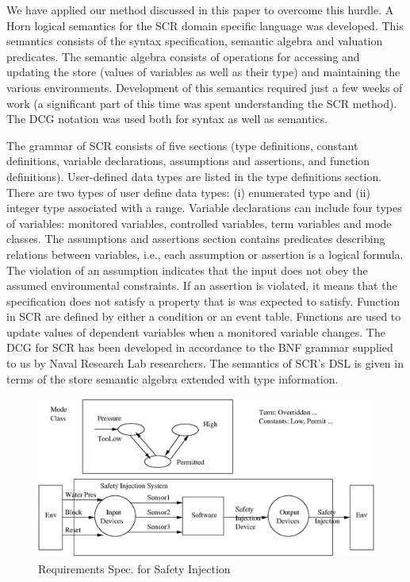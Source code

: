\documentclass{entcs}
\begin{document}
We have applied our method discussed in this paper to overcome this hurdle.
A Horn logical semantics for the SCR domain specific language was developed.
This semantics consists of the syntax specification, semantic algebra and valuation
predicates. The semantic algebra consists of operations for accessing and updating the 
store (values of variables as well as their type) and maintaining the various environments. 
Development of this semantics required just a few weeks of work (a significant
part of this time was spent understanding the SCR method).
The DCG notation was used both for syntax as well as semantics.

The grammar of SCR consists of five sections  (type definitions, constant definitions, 
variable declarations, assumptions and assertions, and function definitions). 
User-defined data types are listed in the type definitions section. 
There are two types of user define data types: (i) enumerated 
type and (ii) integer type associated with a range. 
Variable declarations can include four types of variables:
monitored variables, controlled variables, term variables and mode classes. 
The assumptions and assertions section contains
predicates describing relations between variables, i.e., 
each assumption or assertion is a logical formula. 
The violation of an assumption indicates that the input 
does not obey the assumed environmental constraints. 
If an assertion is violated, it means that the specification 
does not satisfy a property that is was expected to 
satisfy.  Function in SCR are defined by either a 
condition or an event table. Functions are used to 
update values of dependent variables 
when a monitored variable changes. 
The DCG for SCR has been developed in accordance to the BNF grammar supplied to us
by Naval Research Lab researchers. The semantics of SCR's DSL is given 
in terms of the store semantic algebra extended with type information.

\begin{figure}
\begin{center}
  \includegraphics[height=2.1in,width=5.2in]{fig4.eps}
  \caption{Requirements Spec. for Safety Injection}
  \label{actual5}
\end{center}
\end{figure} 
\end{document}
